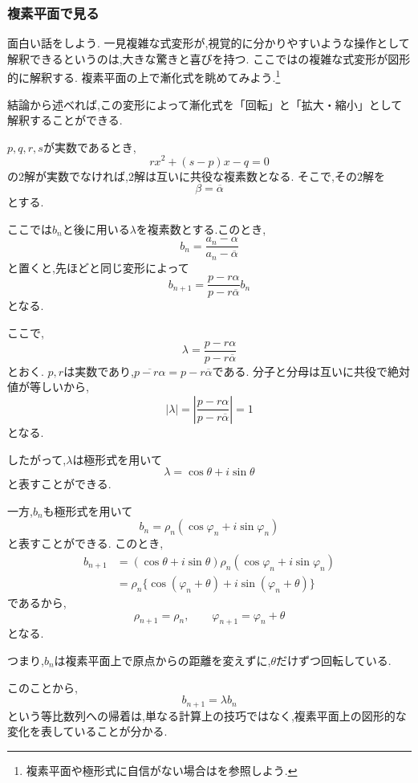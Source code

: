 
\subsubsection{複素平面で見る}\label{節：複素平面で見る}
  面白い話をしよう.
  一見複雑な式変形が,視覚的に分かりやすいような操作として解釈できるというのは,大きな驚きと喜びを持つ.
  ここではの複雑な式変形が図形的に解釈する.
  複素平面の上で漸化式を眺めてみよう.\footnote{複素平面や極形式に自信がない場合はを参照しよう.}

  結論から述べれば,この変形によって漸化式を「回転」と「拡大・縮小」として解釈することができる.
 
  $p,q,r,s$が実数であるとき,
  \[
    rx^2+(s-p)x-q=0
  \]
  の2解が実数でなければ,2解は互いに共役な複素数となる.
  そこで,その2解を
  \[
    \beta=\overline{\alpha}
  \]
  とする.
  
  ここでは$b_n$と後に用いる$\lambda$を複素数とする.このとき,
  \[
    b_n=\frac{a_n-\alpha}{a_n-\overline{\alpha}}
  \]
  と置くと,先ほどと同じ変形によって
  \[
    b_{n+1}
    =
    \frac{p-r\alpha}{p-r\overline{\alpha}}b_n
  \]
  となる.
  
  ここで,
  \[
    \lambda=\frac{p-r\alpha}{p-r\overline{\alpha}}
  \]
  とおく.
  $p,r$は実数であり,$\overline{p-r\alpha}=p-r\overline{\alpha}$である.
  分子と分母は互いに共役で絶対値が等しいから,
  \[
    |\lambda|
    =
    \left|
    \frac{p-r\alpha}{p-r\overline{\alpha}}
    \right|
    =1
  \]
  となる.
  
  したがって,$\lambda$は極形式を用いて
  \[
    \lambda=\cos\theta+i\sin\theta
  \]
  と表すことができる.
  
  一方,$b_n$も極形式を用いて
  \[
    b_n=\rho_n(\cos\varphi_n+i\sin\varphi_n)
  \]
  と表すことができる.
  このとき,
  \begin{align*}
    b_{n+1}
    &=
    (\cos\theta+i\sin\theta)
    \rho_n(\cos\varphi_n+i\sin\varphi_n)\\
    &=
    \rho_n
    \{\cos(\varphi_n+\theta)
    +i\sin(\varphi_n+\theta)\}
  \end{align*}
  であるから,
  \[
    \rho_{n+1}=\rho_n,
    \qquad
    \varphi_{n+1}=\varphi_n+\theta
  \]
  となる.
  
  つまり,$b_n$は複素平面上で原点からの距離を変えずに,$\theta$だけずつ回転している.
  
  このことから,
  \[
    b_{n+1}=\lambda b_n
  \]
  という等比数列への帰着は,単なる計算上の技巧ではなく,複素平面上の図形的な変化を表していることが分かる.
  
